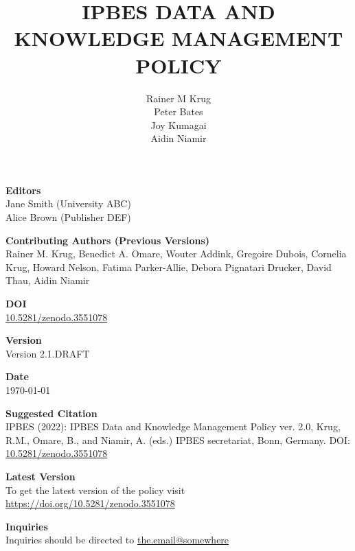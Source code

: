 \documentclass{article}
\title{IPBES DATA AND KNOWLEDGE MANAGEMENT POLICY}
\author{
    Rainer M Krug \\
    Peter Bates \\ 
    Joy Kumagai \\
    Aidin Niamir
}
\date{}
\begin{document}
\maketitle
\begin{center}

{\LARGE \textbf{Editors}} \\[0.5em]
Jane Smith (University ABC) \\
Alice Brown (Publisher DEF) 

\vspace{1.5em}

{\LARGE \textbf{Contributing Authors (Previous Versions)}} \\[0.5em]
Rainer M. Krug, Benedict A. Omare, Wouter Addink, Gregoire Dubois, Cornelia Krug, Howard Nelson, Fatima Parker-Allie, Debora Pignatari Drucker, David Thau, Aidin Niamir

\vspace{1.5em}

{\LARGE \textbf{DOI}} \\[0.5em]
\href{https://doi.org/10.5281/zenodo.3551078}{10.5281/zenodo.3551078}

\vspace{1.5em}

{\LARGE \textbf{Version}} \\[0.5em]
Version 2.1.DRAFT

\vspace{1.5em}

{\LARGE \textbf{Date}} \\[0.5em]
\today

\vspace{1.5em}

{\LARGE \textbf{Suggested Citation}} \\[0.5em]
IPBES (2022): IPBES Data and Knowledge Management Policy ver. 2.0, Krug, R.M., Omare, B., and Niamir, A. (eds.) IPBES secretariat, Bonn, Germany. DOI: \href{https://doi.org/10.5281/zenodo.3551078}{10.5281/zenodo.3551078}

\vspace{1.5em}

{\LARGE \textbf{Latest Version}} \\[0.5em]
To get the latest version of the policy visit \href{https://doi.org/10.5281/zenodo.3551078}{https://doi.org/10.5281/zenodo.3551078}

\vspace{1.5em}

{\LARGE \textbf{Inquiries}} \\[0.5em]
Inquiries should be directed to \href{mailto:the.email@somewhere}{the.email@somewhere}

\end{center}
\end{document}

